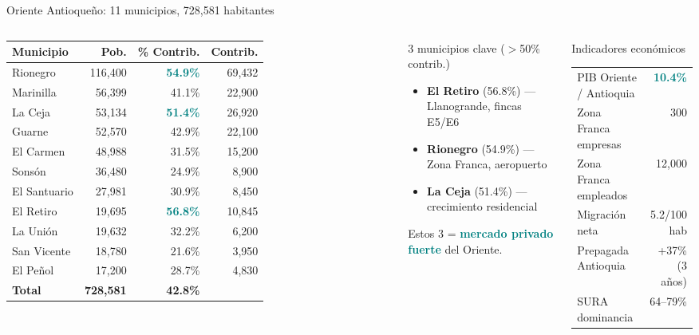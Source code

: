 \documentclass[aspectratio=169, 11pt]{beamer}
\newcommand{\highlight}[1]{\textcolor{teal}{\textbf{#1}}}
\newcommand{\src}[1]{\par\vspace{2pt}{\tiny\textcolor{slate}{Fuente: #1}}}
\begin{document}
\begin{frame}{Oriente Antioqueño: 11 municipios, 728,581 habitantes}
\begin{columns}[T]
{\scriptsize\setlength{\tabcolsep}{3pt}
\begin{tabular}{@{}lrrr@{}}
\toprule
\textbf{Municipio} & \textbf{Pob.} & \textbf{\% Contrib.} & \textbf{Contrib.} \\
\midrule
\rowcolor{teal!8}
Rionegro & 116,400 & \highlight{54.9\%} & 69,432 \\
Marinilla & 56,399 & 41.1\% & 22,900 \\
\rowcolor{teal!6}
La Ceja & 53,134 & \highlight{51.4\%} & 26,920 \\
Guarne & 52,570 & 42.9\% & 22,100 \\
El Carmen & 48,988 & 31.5\% & 15,200 \\
Sonsón & 36,480 & 24.9\% & 8,900 \\
El Santuario & 27,981 & 30.9\% & 8,450 \\
\rowcolor{teal!6}
El Retiro & 19,695 & \highlight{56.8\%} & 10,845 \\
La Unión & 19,632 & 32.2\% & 6,200 \\
San Vicente & 18,780 & 21.6\% & 3,950 \\
El Peñol & 17,200 & 28.7\% & 4,830 \\
\midrule
\textbf{Total} & \textbf{728,581} & \textbf{42.8\%} & \\
\bottomrule
\end{tabular}
}
\src{DANE CNPV 2018, RUAF Aseguramiento Abr 2022}

\begin{exampleblock}{\small 3 municipios clave ($>$50\% contrib.)}
\scriptsize
\begin{itemize}\setlength{\itemsep}{1pt}
  \item \textbf{El Retiro} (56.8\%) --- Llanogrande, fincas E5/E6
  \item \textbf{Rionegro} (54.9\%) --- Zona Franca, aeropuerto
  \item \textbf{La Ceja} (51.4\%) --- crecimiento residencial
\end{itemize}
Estos 3 = \highlight{mercado privado fuerte} del Oriente.
\end{exampleblock}

\vspace{2pt}
\begin{block}{\small Indicadores económicos}
\scriptsize
\begin{tabular}{@{}lr@{}}
PIB Oriente / Antioquia & \highlight{10.4\%} \\
Zona Franca empresas & 300 \\
Zona Franca empleados & 12,000 \\
Migración neta & 5.2/100 hab \\
Prepagada Antioquia & +37\% (3 años) \\
SURA dominancia & 64--79\% \\
\end{tabular}
\end{block}
\end{columns}
\end{frame}
\end{document}
